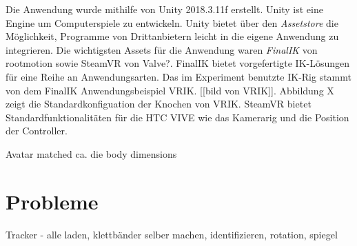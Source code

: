 Die Anwendung wurde mithilfe von Unity 2018.3.11f erstellt. Unity ist eine Engine um Computerspiele zu entwickeln. Unity bietet über den \textit{Assetstore} die Möglichkeit, Programme von Drittanbietern leicht in die eigene Anwendung zu integrieren. Die wichtigsten Assets für die Anwendung waren \textit{FinalIK} von rootmotion\cite{rootmotion} sowie SteamVR von Valve?. FinalIK bietet vorgefertigte IK-Lösungen für eine Reihe an Anwendungsarten. Das im Experiment benutzte IK-Rig stammt von dem FinalIK Anwendungsbeispiel VRIK. [[bild von VRIK]]. Abbildung X zeigt die Standardkonfiguation der Knochen von VRIK. SteamVR bietet Standardfunktionalitäten für die HTC VIVE wie das Kamerarig und die Position der Controller.


Avatar matched ca. die body dimensions

\section{Probleme}
Tracker - alle laden, klettbänder selber machen, identifizieren, rotation, spiegel

 
